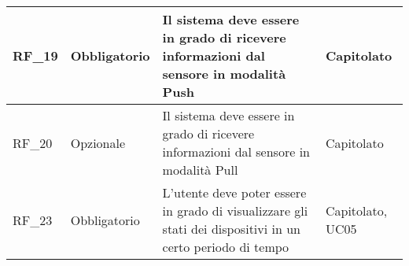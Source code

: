\begin{center}
\begin{xltabular}{\linewidth}{|l|l|X|l|}
        \hline
        RF\_19 & Obbligatorio & Il sistema deve essere in grado di ricevere informazioni dal sensore in modalità Push & Capitolato \\

        \hline
        RF\_20 & Opzionale & Il sistema deve essere in grado di ricevere informazioni dal sensore in modalità Pull & Capitolato \\

        \hline
        RF\_23 & Obbligatorio & L'utente deve poter essere in grado di visualizzare gli stati dei dispositivi in un certo periodo di tempo & Capitolato, UC05 \\

        \hline
    \end{xltabular}
\end{center}


